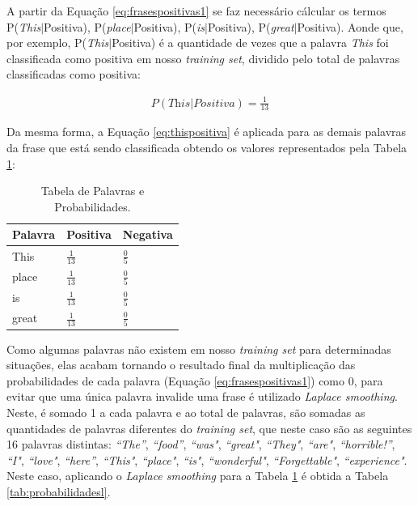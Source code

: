 A partir da Equação \ref{eq:frasespositivas1} se faz necessário cálcular os
termos P(\textit{This}$\vert$Positiva),
P(\textit{place}$\vert$Positiva), P(\textit{is}$\vert$Positiva), P(\textit{great}$\vert$Positiva).
Aonde que, por exemplo, P(\textit{This}$\vert$Positiva) é a quantidade de vezes
que a palavra \textit{This} foi classificada como positiva em nosso
\textit{training set}, dividido pelo total de palavras classificadas como positiva:

\begin{equation}
\begin{gathered}
P(\textit{This}|Positiva) = \frac{1}{13}
\label{eq:thispositiva}
\end{gathered}
\end{equation}


Da mesma forma, a Equação \ref{eq:thispositiva} é aplicada para as demais
palavras da frase que está sendo classificada obtendo os valores representados
pela Tabela \ref{tab:probabilidadesnb}:

\begin{table}[htb]
\centering
\renewcommand{\arraystretch}{1.5}%
\begin{tabular}{lll}
\hline

Palavra & Positiva & Negativa \\ \hline
This & \large $\frac{1}{13}$ & \large $\frac{0}{5}$ \\
place & \large $\frac{1}{13}$ & \large $\frac{0}{5}$ \\
is & \large $\frac{1}{13}$ & \large $\frac{0}{5}$ \\
great & \large $\frac{1}{13}$ & \large $\frac{0}{5}$ \\
\end{tabular}
\caption{Tabela de Palavras e Probabilidades.}
\label{tab:probabilidadesnb}
\end{table}

Como algumas palavras não existem em nosso \textit{training set} para
determinadas situações, elas acabam tornando o resultado final da multiplicação
das probabilidades de cada palavra (Equação \ref{eq:frasespositivas1}) como 0,
para evitar que uma única palavra invalide uma frase é utilizado \textit{Laplace smoothing}. Neste, é somado
1 a cada palavra e ao total de palavras, são somadas as quantidades de palavras diferentes do \textit{training set}, que neste caso são
as seguintes 16 palavras distintas: \textit{``The''}, \textit{``food''},
\textit{``was"}, \textit{``great"}, \textit{``They"}, \textit{``are"},
\textit{``horrible!''}, \textit{``I"}, \textit{``love"}, \textit{``here''},
\textit{``This"}, \textit{``place"}, \textit{``is"}, \textit{``wonderful"},
\textit{``Forgettable"}, \textit{``experience"}. Neste caso, aplicando o
\textit{Laplace smoothing} para a Tabela \ref{tab:probabilidadesnb} é obtida a
Tabela \ref{tab:probabilidadesl}.


